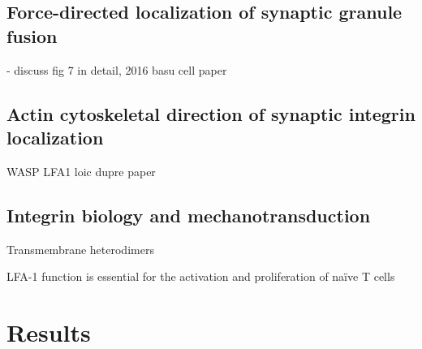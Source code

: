 \subsection{Force-directed localization of synaptic granule fusion}
- discuss fig 7 in detail, 2016 basu cell paper

\subsection{Actin cytoskeletal direction of synaptic integrin localization}
WASP LFA1 loic dupre paper

\subsection{Integrin biology and mechanotransduction}
Transmembrane heterodimers 

LFA-1 function is essential for the activation and proliferation of na{\"i}ve T cells \cite{Wang2009}

\section{Results}

